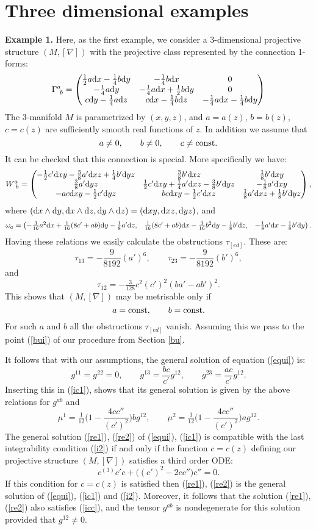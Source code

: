 \documentclass[letterpaper]{amsart}
\theoremstyle{definition}
\theoremstyle{remark}
\newcommand{\be}{\begin{equation}}
\newcommand{\ee}{\end{equation}}
\newcommand{\om}{\omega}
\newcommand{\dz}{\wedge}
\newcommand{\der}{{\rm d}}
\newcommand{\bma}{\begin{pmatrix}}
\newcommand{\ema}{\end{pmatrix}}
\begin{document}
\section{Three dimensional examples}
{\bf Example 1.}
Here, as the first example, we consider a 3-dimensional
projective structure $(M,[\nabla])$ with the projective class
represented by the connection 1-forms:
\be
\Gamma^a_{~b}=\bma \tfrac12 a\der x-\tfrac14b\der y&-\tfrac14 b\der x
& 0\\
-\tfrac14 a \der y&-\tfrac14 a\der x+\tfrac12 b\der y &0\\
c\der y-\tfrac14 a\der z&c\der x-\tfrac14 b\der z&-\tfrac14
a\der x-\tfrac14b\der y\ema 
\label{bul}\ee
The 3-manifold $M$ is parametrized by $(x,y,z)$, and $a=a(z)$,
$b=b(z)$, $c=c(z)$ are sufficiently smooth real functions of $z$.
In addition we assume that 
$$a\neq 0,\quad\quad b\neq 0,\quad\quad c\neq {\rm const}.$$
It can be checked that this connection is special. More specifically
we have:
$$W^a_{~b}=\bma
-\tfrac12 c'\der xy-\tfrac38a'\der xz+\tfrac14b'\der
yz&\tfrac38b'\der xz&\tfrac18b'\der xy\\
\tfrac38 a'\der yz&\tfrac12 c'\der xy+\tfrac14a'\der xz-\tfrac38b'\der yz&-\tfrac18a'\der
xy\\
-ac\der xy-\tfrac12c'\der yz&bc\der xy-\tfrac12c'\der
xz&\tfrac18a'\der xz+\tfrac18b'\der yz
\ema,
$$
where $(\der x\dz\der y,\der x\dz\der z,\der y\dz\der
z)=(\der xy,\der xz,\der yz)$, and
$$\om_a=\bma -\tfrac{3}{16}a^2\der x+\tfrac{1}{16}(8c'+ab)\der
y-\tfrac18a'\der z,&\tfrac{1}{16}(8c'+ab)\der x-\tfrac{3}{16}b^2\der
y-\tfrac18b'\der z,&-\tfrac18a'\der x-\tfrac18b'\der y
\ema.$$
Having these relations we easily calculate the obstructions 
$\tau_{[ed]}$. These are:
$$\tau_{13}=-\frac{9}{8192}(a')^6,\quad\quad
\tau_{23}=-\frac{9}{8192}(b')^6,$$
and $$\tau_{12}=-\tfrac{3}{128}c^2(c')^2(ba'-ab')^2.$$ 
This shows that $(M,[\nabla])$ may be metrisable only if 
$$a={\rm  const},\quad \quad b={\rm const}.$$
For such $a$ and $b$ all the obstructions $\tau_{[ed]}$ vanish. 
Assuming this we pass to the point (\ref{bui}) of our procedure from
Section \ref{bu}.

It follows that with our assumptions, the general 
solution of equation (\ref{equi}) is:
\be
g^{11}=g^{22}=0,\quad\quad g^{13}=\frac{bc}{c'}g^{12},\quad\quad g^{23}=\frac{ac}{c'}g^{12}.\label{re1}\ee
Inserting this in (\ref{ic1}), shows that its general solution is
given by the above relations for $g^{ab}$ and 
\be
\mu^1=\tfrac{1}{12}\Big(1-\frac{4cc''}{(c')^2}\Big)bg^{12},\quad\quad
\mu^2=\tfrac{1}{12}\Big(1-\frac{4cc''}{(c')^2}\Big)ag^{12}.\label{re2}\ee
The general solution (\ref{re1}), (\ref{re2}) of
(\ref{equi}), (\ref{ic1}) is compatible with
the last integrability condition (\ref{i2}) if and only if 
the function $c=c(z)$ defining our projective
structure $(M,[\nabla])$ satisfies a third order ODE:
\be
c^{(3)}c'c+\Big( (c')^2-2c c''\Big)c''=0.\label{re3}
\ee
If this condition for $c=c(z)$ is satisfied then (\ref{re1}),
(\ref{re2}) is the general solution of (\ref{equi}), (\ref{ic1}) and
(\ref{i2}). Moreover, it follows that the solution (\ref{re1}),
(\ref{re2}) also satisfies (\ref{icc}), and the tensor $g^{ab}$ is
nondegenerate for this solution provided that $g^{12}\neq 0$.  
\end{document}
